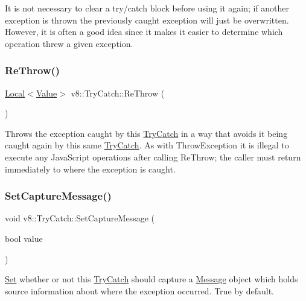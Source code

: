It is not necessary to clear a try/catch block before using it again; if another exception is thrown the previously caught exception will just be overwritten. However, it is often a good idea since it makes it easier to determine which operation threw a given exception. \mbox{\label{classv8_1_1TryCatch_ab8c3a1dbb38e6fd00e37436034daf707}} 
\subsubsection{\texorpdfstring{Re\+Throw()}{ReThrow()}}
{\footnotesize\ttfamily \mbox{\hyperlink{classv8_1_1Local}{Local}}$<$\mbox{\hyperlink{classv8_1_1Value}{Value}}$>$ v8\+::\+Try\+Catch\+::\+Re\+Throw (\begin{DoxyParamCaption}{ }\end{DoxyParamCaption})}

Throws the exception caught by this \mbox{\hyperlink{classv8_1_1TryCatch}{Try\+Catch}} in a way that avoids it being caught again by this same \mbox{\hyperlink{classv8_1_1TryCatch}{Try\+Catch}}. As with Throw\+Exception it is illegal to execute any Java\+Script operations after calling Re\+Throw; the caller must return immediately to where the exception is caught. \mbox{\label{classv8_1_1TryCatch_a541b8fa6951bd5a439692c22d5c7b73c}} 
\subsubsection{\texorpdfstring{Set\+Capture\+Message()}{SetCaptureMessage()}}
{\footnotesize\ttfamily void v8\+::\+Try\+Catch\+::\+Set\+Capture\+Message (\begin{DoxyParamCaption}\item[{bool}]{value }\end{DoxyParamCaption})}

\mbox{\hyperlink{classv8_1_1Set}{Set}} whether or not this \mbox{\hyperlink{classv8_1_1TryCatch}{Try\+Catch}} should capture a \mbox{\hyperlink{classv8_1_1Message}{Message}} object which holds source information about where the exception occurred. True by default. \mbox{\label{classv8_1_1TryCatch_a032cd889d76bd596e2616df11ced8682}} 
